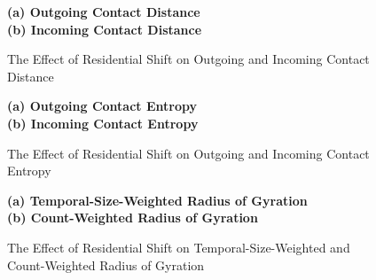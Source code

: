 \begin{figure}[ht!]
\centering
\caption{The Effect of Residential Shift on Outgoing and Incoming Contact Distance}
\vspace{0.3cm}

\textbf{(a) Outgoing Contact Distance}\\


\vspace{0.3cm}
\textbf{(b) Incoming Contact Distance}\\


\label{fig:effect_of_residential_shift_on_incoming_contact_distance}
\end{figure}


\begin{figure}[ht!]
\centering
\caption{The Effect of Residential Shift on Outgoing and Incoming Contact Entropy}
\vspace{0.3cm}

\textbf{(a) Outgoing Contact Entropy}\\



\vspace{0.3cm}
\textbf{(b) Incoming Contact Entropy}\\


\label{fig:effect_of_residential_shift_on_outgoing_incoming_social_entropy}
\end{figure}



\begin{figure}[ht!]
\centering
\caption{The Effect of Residential Shift on Temporal-Size-Weighted and Count-Weighted Radius of Gyration}
\vspace{0.3cm}

\textbf{(a) Temporal-Size-Weighted Radius of Gyration}\\


\vspace{0.3cm}
\textbf{(b) Count-Weighted Radius of Gyration}\\


\label{fig:effect_of_residential_shift_on_temporal_size_weighted_count_weighted_radius_of_gyration}
\end{figure}



